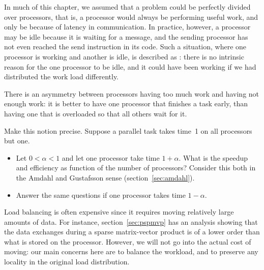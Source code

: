 
In much of this chapter, we assumed that a problem could be perfectly
divided over processors, that is, a processor would always be
performing useful work, and only be 
because of latency in communication. In practice, however, a processor
may be idle because it is waiting for a message, and the sending
processor has not even reached the send instruction in its code. Such
a situation, where one processor is working and another is idle, is
described as : there is no intrinsic reason
for the one processor to be idle, and it could have been working if we
had distributed the work load differently.

There is an asymmetry between processors having too much work and
having not enough work: it is better to have one processor that
finishes a task early, than having one that is overloaded so that all
others wait for it.

\begin{exercise}
  Make this notion precise. Suppose a parallel task takes time~1 on
  all processors but one. 
  \begin{itemize}
  \item Let $0<\alpha<1$ and let one processor take time
    $1+\alpha$. What is the speedup and efficiency as function of the
    number of processors? Consider this both in the Amdahl and
    Gustafsson sense (section~\ref{sec:amdahl}).
  \item Answer the same questions if one processor takes time $1-\alpha$.
  \end{itemize}
\end{exercise}

Load balancing is often expensive since it requires moving relatively
large amounts of data. For instance, section~\ref{sec:pspmvp} has an
analysis showing that the data exchanges during a sparse matrix-vector
product is of a lower order than what is stored on the
processor. However, we will not go into the actual cost of moving: our
main concerns here are to balance the workload, and to preserve any
locality in the original load distribution.

